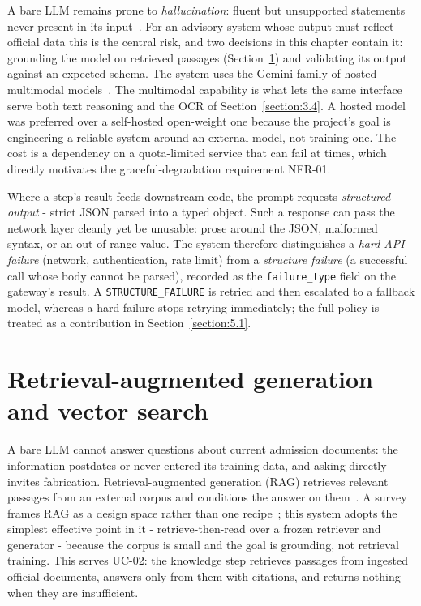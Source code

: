 \documentclass[../main.tex]{subfiles}
\begin{document}
A bare \gls{LLM} remains prone to \textit{hallucination}: fluent but unsupported statements never present in its input~\cite{ji2023hallucination}.
For an advisory system whose output must reflect official data this is the central risk, and two decisions in this chapter contain it: grounding the model on retrieved passages (Section~\ref{section:3.2}) and validating its output against an expected schema.
The system uses the Gemini family of hosted multimodal models~\cite{gemini, geminiteam2023}.
The multimodal capability is what lets the same interface serve both text reasoning and the \gls{OCR} of Section~\ref{section:3.4}.
A hosted model was preferred over a self-hosted open-weight one because the project's goal is engineering a reliable system around an external model, not training one.
The cost is a dependency on a quota-limited service that can fail at times, which directly motivates the graceful-degradation requirement NFR-01.

Where a step's result feeds downstream code, the prompt requests \textit{structured output} - strict \gls{JSON} parsed into a typed object.
Such a response can pass the network layer cleanly yet be unusable: prose around the \gls{JSON}, malformed syntax, or an out-of-range value.
The system therefore distinguishes a \textit{hard \gls{API} failure} (network, authentication, rate limit) from a \textit{structure failure} (a successful call whose body cannot be parsed), recorded as the \texttt{failure\_type} field on the gateway's result.
A \texttt{STRUCTURE\_FAILURE} is retried and then escalated to a fallback model, whereas a hard failure stops retrying immediately; the full policy is treated as a contribution in Section~\ref{section:5.1}.

\section{Retrieval-augmented generation and vector search}
\label{section:3.2}

A bare \gls{LLM} cannot answer questions about current admission documents: the information postdates or never entered its training data, and asking directly invites fabrication.
Retrieval-augmented generation (\gls{RAG}) retrieves relevant passages from an external corpus and conditions the answer on them~\cite{lewis2020rag}.
A survey frames \gls{RAG} as a design space rather than one recipe~\cite{gao2023ragsurvey}; this system adopts the simplest effective point in it - retrieve-then-read over a frozen retriever and generator - because the corpus is small and the goal is grounding, not retrieval training.
This serves UC-02: the knowledge step retrieves passages from ingested official documents, answers only from them with citations, and returns nothing when they are insufficient.
\end{document}
